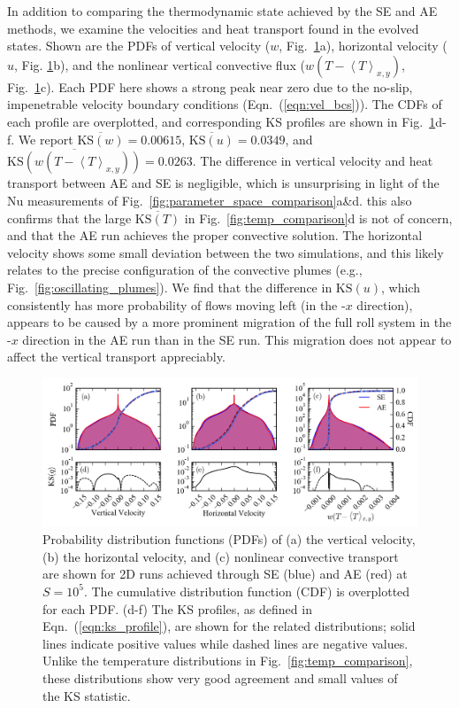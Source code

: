 \documentclass[aps, pre, onecolumn, nofootinbib, notitlepage, groupedaddress, amsfonts, amssymb, amsmath, longbibliography]{revtex4-1}
\newcommand{\angles}[1]{\ensuremath{\left\langle #1 \right\rangle}}
\newcommand{\KS}[1]{\ensuremath{\text{KS}(#1)}}
\newcommand{\KSstat}[1]{\ensuremath{\overline{\text{KS}(#1)}}}
\begin{document}
In addition to comparing the thermodynamic state achieved by the SE and AE methods,
we examine the velocities and heat transport found in the evolved states.
Shown are the PDFs of 
vertical velocity ($w$, Fig.~\ref{fig:pdf_comparison}a), horizontal velocity ($u$, Fig. \ref{fig:pdf_comparison}b),
and the nonlinear vertical convective flux ($w(T - \angles{T}_{x,y})$, Fig.~\ref{fig:pdf_comparison}c). 
Each PDF here shows a strong peak near zero due to the no-slip, impenetrable
velocity boundary conditions (Eqn.~(\ref{eqn:vel_bcs})).
The CDFs of each profile are overplotted, and corresponding KS profiles are
shown in Fig.~\ref{fig:pdf_comparison}d-f.  We report
$\KSstat{w} = 0.00615$, $\KSstat{u} = 0.0349$,
and $\KSstat{w(T - \angles{T}_{x,y})} = 0.0263$.
The difference in vertical velocity
and heat transport between AE and SE is negligible, which is unsurprising in light of
the Nu measurements of Fig.~\ref{fig:parameter_space_comparison}a\&d.
this also confirms that the large $\KSstat{T}$ in Fig.~\ref{fig:temp_comparison}d is
not of concern, and that the AE run achieves the proper convective solution.
The horizontal velocity shows some small deviation between the two simulations, and this
likely relates to the precise configuration of the convective plumes (e.g., Fig.~\ref{fig:oscillating_plumes}).
We find that the difference in $\KS{u}$, which consistently has more probability
of flows moving left (in the -$x$ direction), appears to be caused by a more prominent migration 
of the full roll system in the -$x$ direction in the AE run than in the SE run. 
This migration does not appear to affect the vertical transport appreciably.


\begin{figure}[t]
\includegraphics[width=\textwidth]{./figs/pdf_comparison.png}
\caption{Probability distribution functions (PDFs) of (a) the vertical velocity, (b) the horizontal velocity, and (c) nonlinear
convective transport are shown for 2D runs achieved through SE (blue) and AE (red)
at $S = 10^{5}$.  The cumulative distribution function (CDF) is overplotted for each PDF. 
(d-f) The KS profiles, as defined in Eqn.~(\ref{eqn:ks_profile}),
are shown for the related distributions; solid lines indicate positive values
while dashed lines are negative values. Unlike the temperature distributions in
Fig.~\ref{fig:temp_comparison}, these distributions
show very good agreement and small values of the KS statistic.
\label{fig:pdf_comparison} }
\end{figure}
\end{document}
